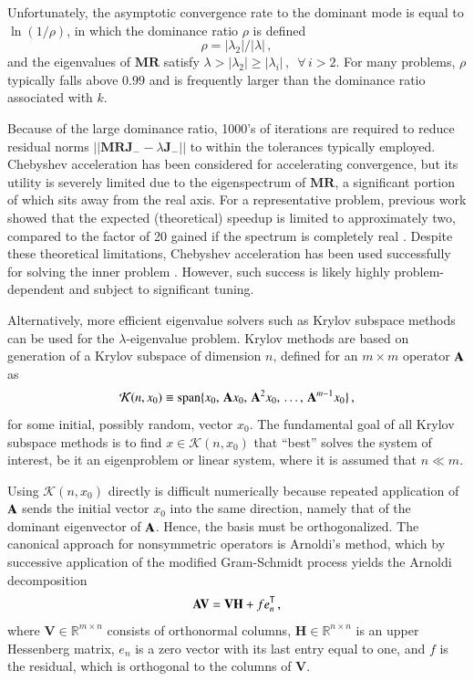 Unfortunately, the asymptotic convergence rate to the dominant mode is 
equal to $\ln{(1/\rho)}$, in which the dominance ratio $\rho$  is defined
\begin{equation}
 \rho = |\lambda_2| / |\lambda| \, ,
\end{equation}
and the eigenvalues of 
$\mathbf{M}\mathbf{R}$ satisfy 
$\lambda > |\lambda_2| \geq |\lambda_i| \, , \,\,\, \forall \, i > 2$.  
For many problems, $\rho$ typically falls 
above $0.99$ and is frequently larger than the dominance 
ratio associated with $k$.

Because of the large dominance ratio, 1000's of iterations are required 
to reduce residual norms $||\mathbf{MRJ}_- - \lambda \mathbf{J}_-||$ to 
within the tolerances typically employed. 
Chebyshev acceleration 
has been considered for accelerating convergence, but its utility is severely 
limited due to the eigenspectrum of $\mathbf{MR}$, a 
significant portion of which sits away from the real axis.  
For a representative problem, previous work 
showed that the expected (theoretical) speedup is limited to 
approximately two, compared to the factor of 20 gained if the spectrum is
completely real \cite{roberts2012ksi}.
Despite these theoretical limitations, 
Chebyshev acceleration has been used successfully for solving the inner 
problem \cite{zhang2012ehs}.  However, such success is likely highly 
problem-dependent and subject to significant tuning.

Alternatively,
more efficient eigenvalue solvers such as Krylov subspace 
methods can be used for the $\lambda$-eigenvalue problem.  
Krylov methods are based on generation
of a Krylov subspace of dimension $n$, 
defined for an $m \times m$ operator $\mathbf{A}$ as
\begin{equation}
 \mathcal{K}(n,x_0) \equiv \text{span} 
     \{x_0,\, \mathbf{A}x_0,\, \mathbf{A}^2x_0 , \, 
        \ldots , \, \mathbf{A}^{m-1}x_0 \} \, , 
 \label{eq:krylovsubspace}
\end{equation}
for some initial, possibly random, vector $x_0$.  The fundamental 
goal of all Krylov subspace methods is to find  $x \in \mathcal{K}(n,x_0)$  
that ``best'' solves the system of interest, be it an 
eigenproblem or linear system, where it is assumed that $n \ll m$.

Using $\mathcal{K}(n, x_0)$ directly is difficult numerically because
repeated application of $\mathbf{A}$ sends the initial vector $x_0$ into the
same direction, namely that of the dominant eigenvector of $\mathbf{A}$.  
Hence, the basis 
must be orthogonalized. The canonical approach for nonsymmetric 
operators is Arnoldi's method, which by successive application of the 
modified Gram-Schmidt process yields the Arnoldi decomposition
\begin{equation}
 \mathbf{A}\mathbf{V} = \mathbf{V} \mathbf{H} + fe^{\mathsf{T}}_n \, ,
\end{equation}
where $\mathbf{V} \in \mathbb{R}^{m\times n}$  consists of
orthonormal columns,
$\mathbf{H} \in \mathbb{R}^{n \times n} $ is an upper Hessenberg matrix, 
$e_n$ is a zero vector with its last entry equal to one, and $f$ is 
the residual, which is orthogonal to the columns of $\mathbf{V}$.  

